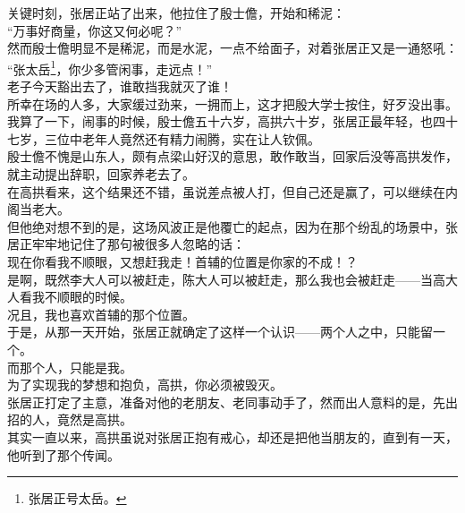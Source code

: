 \begin{multicols}{\theparacolNo}
关键时刻，张居正站了出来，他拉住了殷士儋，开始和稀泥：\\

“万事好商量，你这又何必呢？”\\

然而殷士儋明显不是稀泥，而是水泥，一点不给面子，对着张居正又是一通怒吼：\\

“张太岳\footnote{张居正号太岳。}，你少多管闲事，走远点！”\\

老子今天豁出去了，谁敢挡我就灭了谁！\\

所幸在场的人多，大家缓过劲来，一拥而上，这才把殷大学士按住，好歹没出事。\\

我算了一下，闹事的时候，殷士儋五十六岁，高拱六十岁，张居正最年轻，也四十七岁，三位中老年人竟然还有精力闹腾，实在让人钦佩。\\

殷士儋不愧是山东人，颇有点梁山好汉的意思，敢作敢当，回家后没等高拱发作，就主动提出辞职，回家养老去了。\\

在高拱看来，这个结果还不错，虽说差点被人打，但自己还是赢了，可以继续在内阁当老大。\\

但他绝对想不到的是，这场风波正是他覆亡的起点，因为在那个纷乱的场景中，张居正牢牢地记住了那句被很多人忽略的话：\\

现在你看我不顺眼，又想赶我走！首辅的位置是你家的不成！？\\

是啊，既然李大人可以被赶走，陈大人可以被赶走，那么我也会被赶走——当高大人看我不顺眼的时候。\\

况且，我也喜欢首辅的那个位置。\\

于是，从那一天开始，张居正就确定了这样一个认识——两个人之中，只能留一个。\\

而那个人，只能是我。\\

为了实现我的梦想和抱负，高拱，你必须被毁灭。\\

张居正打定了主意，准备对他的老朋友、老同事动手了，然而出人意料的是，先出招的人，竟然是高拱。\\

其实一直以来，高拱虽说对张居正抱有戒心，却还是把他当朋友的，直到有一天，他听到了那个传闻。\\


\end{multicols}
